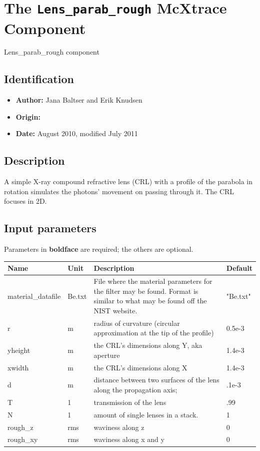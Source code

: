 \section{The \texttt{Lens\_parab\_rough} McXtrace Component}
Lens\_parab\_rough component

\subsection*{Identification}
\begin{itemize}
  \item \textbf{Author:} Jana Baltser and Erik Knudsen
  \item \textbf{Origin:} 
  \item \textbf{Date:} August 2010, modified July 2011
\end{itemize}

\subsection*{Description}
A simple X-ray compound refractive lens (CRL) with a profile of the parabola in rotation simulates the photons' movement on passing through it. The CRL focuses in 2D.

\subsection*{Input parameters}
Parameters in \textbf{boldface} are required; the others are optional.

\begin{longtable}{p{}p{}p{}p{}}
\toprule
\textbf{Name} & \textbf{Unit} & \textbf{Description} & \textbf{Default} \\
\midrule
\endhead
material\_datafile & Be.txt & File where the material parameters for the filter may be found. Format is similar to what may be found off the NIST website. & "Be.txt" \\
r & m & radius of curvature (circular approximation at the tip of the profile) & 0.5e-3 \\
yheight & m & the CRL's dimensions along Y, aka aperture & 1.4e-3 \\
xwidth & m & the CRL's dimensions along X & 1.4e-3 \\
d & m & distance between two surfaces of the lens along the propagation axis; & .1e-3 \\
T & 1 & transmission of the lens & .99 \\
N & 1 & amount of single lenses in a stack. & 1 \\
rough\_z & rms & waviness along z & 0 \\
rough\_xy & rms & waviness along x and y & 0 \\
\bottomrule
\end{longtable}

